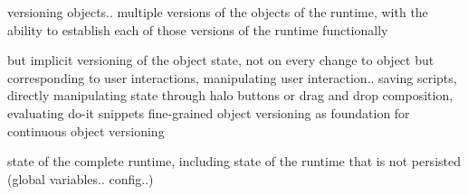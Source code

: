 versioning objects.. multiple versions of the objects of the runtime, with the ability to establish each of those versions of the runtime functionally

but implicit versioning of the object state, not on every change to object but corresponding to user interactions, manipulating user interaction.. saving scripts, directly manipulating state through halo buttons or drag and drop composition, evaluating do-it snippets
fine-grained object versioning as foundation for continuous object versioning

state of the complete runtime, including state of the runtime that is not persisted (global variables.. config..)

